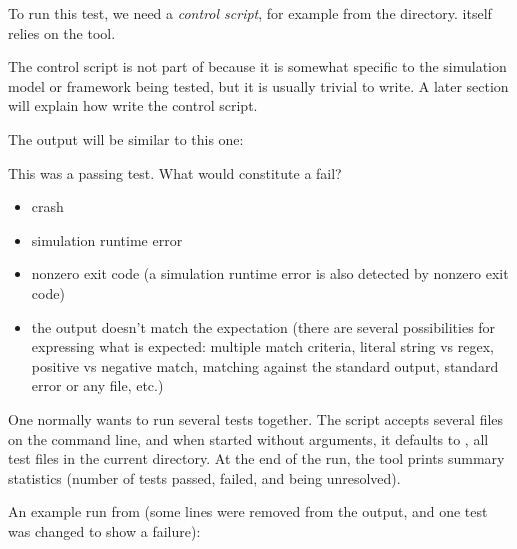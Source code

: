 To run this test, we need a \textit{control script}, for example
 from the  directory. 
itself relies on the  tool.

\begin{note}
The control script is not part of {\opp} because it is somewhat specific to
the simulation model or framework being tested, but it is usually trivial
to write. A later section will explain how write the control script.
\end{note}

The output will be similar to this one:


This was a passing test. What would constitute a fail?

\begin{itemize}
\item crash
\item simulation runtime error
\item nonzero exit code (a simulation runtime error is also detected by nonzero exit code)
\item the output doesn't match the expectation (there are several possibilities
   for expressing what is expected: multiple match criteria, literal string vs regex,
   positive vs negative match, matching against the standard output, standard error
   or any file, etc.)
\end{itemize}

One normally wants to run several tests together. The  script accepts
several  files on the command line, and when started without
arguments, it defaults to , all test files in the current
directory. At the end of the run, the tool prints summary statistics
(number of tests passed, failed, and being unresolved).

An example run from  (some lines were removed from
the output, and one test was changed to show a failure):

